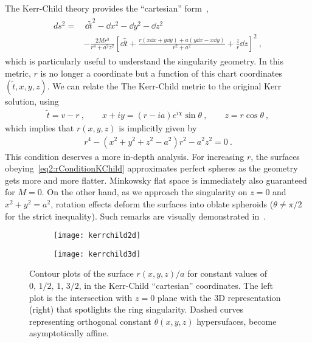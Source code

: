 The Kerr-Child theory provides the ``cartesian'' form~\cite{Teukolsky2015}, 
\begin{align}
    \begin{split}
        ds^2 = & \, \dd \tilde{t}^2 - \dd x^2 - \dd y^2 - \dd z^2 \\
        & - \frac{2 M r^3}{r^4 + a^2 z^2} \left[ \dd \tilde{t} + \frac{r (x \dd x + y \dd y) + a ( y \dd x - x \dd y)}{r^2+a^2} + \frac{z}{r} \dd z \right]^2 ~,
    \end{split}
    \label{eq2:KerrChild}
\end{align}
which is particularly useful to understand the singularity geometry.
In this metric, $r$ is no longer a coordinate but a function of this chart coordinates $(\tilde{t},x,y,z)$.
We can relate the The Kerr-Child metric to the original Kerr solution, using
\begin{align}
    \tilde{t} = v - r ~, \qquad x+ i y = (r -i a) e^{i \chi} \sin\theta ~,\qquad z=r\cos\theta ~,
    \label{eq2:InEFtoKChild}
\end{align}
which implies that $r(x,y,z)$ is implicitly given by
\begin{align}
    r^4 - (x^2+y^2+z^2-a^2)r^2 -a^2 z^2 = 0 ~.
    \label{eq2:rConditionKChild}
\end{align}
This condition deserves a more in-depth analysis.
For increasing $r$, the surfaces obeying~\eqref{eq2:rConditionKChild} approximates perfect spheres as the geometry gets more and more flatter. Minkowsky flat space is immediately also guaranteed for $M=0$.
On the other hand, as we approach the singularity on $z=0$ and $x^2+y^2 = a^2$, rotation effects deform the surfaces into oblate spheroids ($\theta\ne\pi/2$ for the strict inequality).
Such remarks are visually demonstrated in~.

\begin{figure}[h]
    \centering
    \begin{subfigure}[c]{0.45\textwidth}
        \texttt{[image: kerrchild2d]}
    \end{subfigure}
    \hspace{1cm}
    \begin{subfigure}[c]{0.35\textwidth}
        \texttt{[image: kerrchild3d]}
    \end{subfigure}
    \caption{Contour plots of the surface $r(x,y,z)/a$ for constant values of $0,\,1/2,\,1,\,3/2$, in the Kerr-Child ``cartesian'' coordinates. The left plot is the intersection with $z=0$ plane with the 3D representation (right) that spotlights the ring singularity. Dashed curves representing orthogonal constant $\theta(x,y,z)$ hypersufaces, become asymptotically affine.}\label{fig2:kerrchild}
\end{figure}

